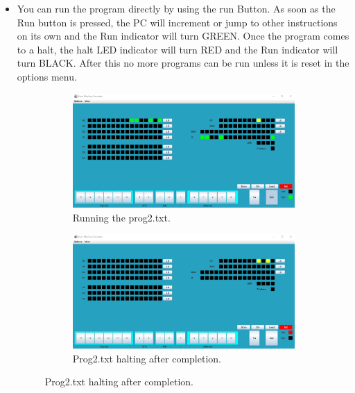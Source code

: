 \documentclass[10pt]{article}
\begin{document}
\begin{enumerate}
\begin{itemize}
\begin{figure}[H]
      \caption{After Pressing the SS Button on ipl.txt}
      \label{fig:SSButton}
    \end{figure}
    \item You can run the program directly by using the run Button. As soon as the Run button is pressed, the
    PC will increment or jump to other instructions on its own and the Run indicator will turn GREEN.
    Once the program comes to a halt, the halt LED indicator will turn RED and the Run indicator will turn BLACK. 
    After this no more programs can be run unless it is reset in the options menu.
    \begin{figure}[H]
      \centering
      \begin{subfigure}[b]{0.48\textwidth}
        \includegraphics[width=\textwidth]{Pics/Fig10.png}
        \caption{Running the prog2.txt.}
        \label{fig:ProgramRun}
      \end{subfigure}
      \hfill
      \begin{subfigure}[b]{0.48\textwidth}
        \includegraphics[width=\textwidth]{Pics/Fig11.png}
        \caption{Prog2.txt halting after completion.}
        \label{fig:ProgramHalt}
      \end{subfigure}
    \end{figure}
  \end{itemize}
\end{enumerate}
\end{document}
